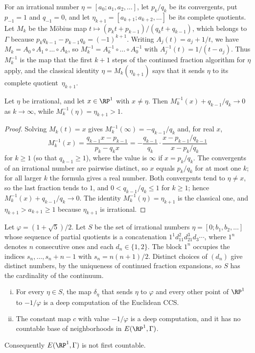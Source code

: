 For an irrational number $\eta=[a_0;a_1,a_2,\dots]$, let $p_k/q_k$ be its
convergents, put $p_{-1}=1$ and $q_{-1}=0$, and let
$\eta_{k+1}=[a_{k+1};a_{k+2},\dots]$ be its complete quotients.
Let $M_k$ be the Möbius map $t\mapsto(p_kt+p_{k-1})/(q_kt+q_{k-1})$, which belongs
to $\Gamma$ because $p_kq_{k-1}-p_{k-1}q_k=(-1)^{k+1}$.
Writing $A_j(t)=a_j+1/t$, we have $M_k=A_0\circ A_1\circ\dots\circ A_k$, so
$M_k^{-1}=A_k^{-1}\circ\dots\circ A_0^{-1}$ with $A_j^{-1}(t)=1/(t-a_j)$.
Thus $M_k^{-1}$ is the map that the first $k+1$ steps of the continued fraction
algorithm for $\eta$ apply, and the classical identity $\eta=M_k(\eta_{k+1})$ says
that it sends $\eta$ to its complete quotient~$\eta_{k+1}$.

\begin{lem}\label{lem:euclid-limit}
Let $\eta$ be irrational, and let $x\in\RP^1$ with $x\ne\eta$.
Then $M_k^{-1}(x)+q_{k-1}/q_k\to0$ as $k\to\infty$, while $M_k^{-1}(\eta)=\eta_{k+1}>1$.
\end{lem}

\begin{proof}
Solving $M_k(t)=x$ gives $M_k^{-1}(\infty)=-q_{k-1}/q_k$ and, for real $x$,
\[
M_k^{-1}(x)=\frac{q_{k-1}x-p_{k-1}}{p_k-q_kx}=-\frac{q_{k-1}}{q_k}\cdot\frac{x-p_{k-1}/q_{k-1}}{x-p_k/q_k}
\]
for $k\ge1$ (so that $q_{k-1}\ge1$), where the value is $\infty$ if $x=p_k/q_k$.
The convergents of an irrational number are pairwise distinct, so $x$ equals
$p_k/q_k$ for at most one $k$; for all larger $k$ the formula gives a real number.
Both convergents tend to $\eta\ne x$, so the last fraction tends to $1$, and
$0<q_{k-1}/q_k\le1$ for $k\ge1$; hence $M_k^{-1}(x)+q_{k-1}/q_k\to0$.
The identity $M_k^{-1}(\eta)=\eta_{k+1}$ is the classical one, and
$\eta_{k+1}>a_{k+1}\ge1$ because $\eta_{k+1}$ is irrational.
\end{proof}

Let $\varphi=(1+\sqrt5)/2$.
Let $S$ be the set of irrational numbers $\eta=[0;b_1,b_2,\dots]$ whose sequence
of partial quotients is a concatenation $1^{1}d_11^{2}d_21^{3}d_3\cdots$, where
$1^n$ denotes $n$ consecutive ones and each $d_n\in\{1,2\}$.
The block $1^n$ occupies the indices $s_n,\dots,s_n+n-1$ with $s_n=n(n+1)/2$.
Distinct choices of $(d_n)$ give distinct numbers, by the uniqueness of
continued fraction expansions, so $S$ has the cardinality of the continuum.

\begin{prop}\label{prop:euclid}
\begin{enumerate}[(i)]
\item For every $\eta\in S$, the map $\delta_\eta$ that sends $\eta$ to $\varphi$
and every other point of $\RP^1$ to $-1/\varphi$ is a deep computation of the
Euclidean CCS.
\item The constant map $c$ with value $-1/\varphi$ is a deep computation, and it
has no countable base of neighborhoods in $E(\RP^1,\Gamma)$.
\end{enumerate}
Consequently $E(\RP^1,\Gamma)$ is not first countable.
\end{prop}

